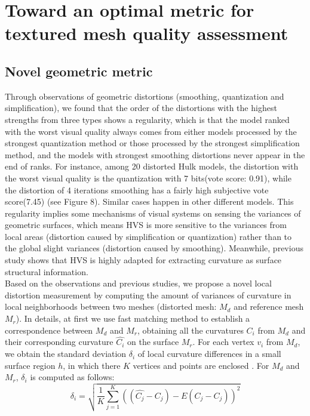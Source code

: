 \section{Toward an optimal metric for textured mesh quality assessment}
\subsection{Novel geometric metric}
Through observations of geometric distortions (smoothing, quantization and simplification), we found that the order of the distortions with the highest strengths from three types shows a regularity, which is that the model ranked with the worst visual quality always comes from either models processed by the strongest quantization method or those processed by the strongest simplification method, and the models with strongest smoothing distortions never appear in the end of ranks. For instance, among 20 distorted Hulk models, the distortion with the worst visual quality is the quantization with 7 bits(vote score: 0.91), while the distortion of 4 iterations smoothing has a fairly high subjective vote score(7.45) (see Figure 8).  Similar cases happen in other different models. This regularity implies some mechanisms of visual systems on sensing the variances of geometric surfaces, which means HVS is more sensitive to the variances from local areas (distortion caused by simplification or quantization) rather than to the global slight variances (distortion caused by smoothing). Meanwhile, previous study \cite{Guo_2015} shows that HVS is highly adapted for extracting curvature as surface structural information.\\
Based on the observations and previous studies, we propose a novel local distortion measurement by computing the amount of variances of curvature in local neighborhoods between two meshes (distorted mesh: $M_d$ and reference mesh $M_r$).  In details, at first we use fast matching method to establish a correspondence between $M_d$ and $M_r$, obtaining all the curvatures {$C_i$} from $M_d$ and their corresponding curvature {$\hat{C_i}$} on the surface $M_r$. For each vertex {$v_i$} from $M_d$, we obtain the standard deviation $\delta_i$ of local curvature differences in a small surface region $h$, in which there $K$ vertices and points are enclosed . For $M_d$ and $M_r$, $\delta_i$ is computed as follows:
\begin{equation}
\delta_i =\sqrt{\frac{1}{K}\sum_{j=1}^{K}{((\hat{C_j}-C_j)-E(\hat{C_j}-C_j))^2}}
\end{equation}
  
